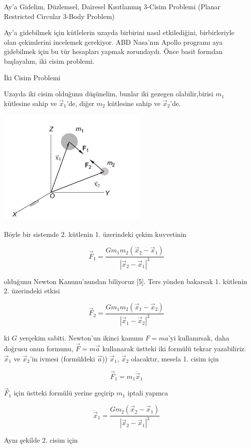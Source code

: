 \documentclass[12pt,fleqn]{article}\usepackage{../../common}
\begin{document}
Ay'a Gidelim, Düzlemsel, Dairesel Kısıtlanmış 3-Cisim Problemi (Planar
Restricted Circular 3-Body Problem)

Ay'a gidebilmek için kütlelerin uzayda birbirini nasıl etkilediğini,
birbirleriyle olan çekimlerini incelemek gerekiyor. ABD Nasa'nın Apollo
programı aya gidebilmek için bu tür hesapları yapmak zorundaydı. Önce basit
formdan başlayalım, iki cisim problemi.
 
İki Cisim Problemi

Uzayda iki cisim olduğunu düşünelim, bunlar iki gezegen olabilir,birisi
$m_1$ kütlesine sahip ve $\vec{x}_1$'de, diğer $m_2$ kütlesine sahip ve
$\vec{x}_2$'de.

\includegraphics[width=20em]{chaos_app01_03.png}

Böyle bir sistemde 2. kütlenin 1. üzerindeki çekim kuvvetinin

$$ 
\vec{F}_1 = 
\frac{G m_1 m_2 (\vec{x}_2-\vec{x}_1)  }{ | \vec{x}_2 - \vec{x}_1|^3  }
$$

olduğunu Newton Kanunu'nundan biliyoruz [5]. Ters yönden bakarsak 1. kütlenin
2. üzerindeki etkisi

$$ 
\vec{F}_2 = 
\frac{G m_1 m_2 (\vec{x}_1-\vec{x}_2)  }{ | \vec{x}_1 - \vec{x}_2|^3  }
$$

ki $G$ yerçekim sabiti. Newton'un ikinci kanunu $F=ma$'yi kullanırsak, daha
doğrusu onun formunu, $\vec{F} = m \vec{a}$ kullanarak üstteki iki formülü
tekrar yazabiliriz. $\vec{x}_1$ ve $\vec{x}_2$'in ivmesi (formüldeki
$\vec{a}$)) $\ddot{\vec{x}}_1$, $\ddot{\vec{x}}_2$ olacaktır, mesela
1. cisim için 

$$ \vec{F}_1=  m_1 \ddot{\vec{x}}_1 $$

$\vec{F}_1$  için üstteki formülü yerine geçirip $m_1$ iptali yapınca

$$ \ddot{\vec{x}}_1  = \frac{G m_2 (\vec{x}_2-\vec{x}_1)  }{ | \vec{x}_2 - \vec{x}_1|^3  }$$

Aynı şekilde 2. cisim için
\end{document}

